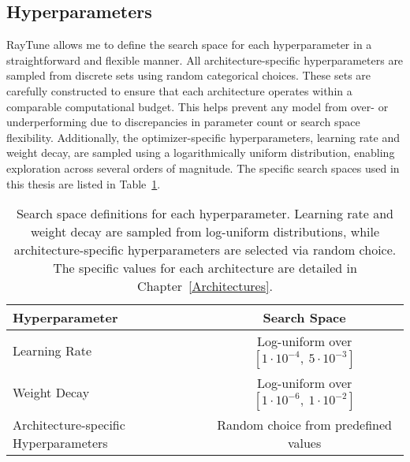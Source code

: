 \subsection{Hyperparameters}

RayTune allows me to define the search space for each hyperparameter in a straightforward and flexible manner. All architecture-specific hyperparameters are sampled from discrete sets using random categorical choices. These sets are carefully constructed to ensure that each architecture operates within a comparable computational budget. This helps prevent any model from over- or underperforming due to discrepancies in parameter count or search space flexibility. Additionally, the optimizer-specific hyperparameters, learning rate and weight decay, are sampled using a logarithmically uniform distribution, enabling exploration across several orders of magnitude. The specific search spaces used in this thesis are listed in Table~\ref{MethodHyperparams}.

\begin{table}[H]
    \centering
    \begin{tabular}{l|c}
        Hyperparameter & Search Space       \\
        \hline
        Learning Rate      & Log-uniform over $[1 \cdot 10^{-4},\ 5 \cdot 10^{-3}]$ \\
        Weight Decay     & Log-uniform over $[1 \cdot 10^{-6},\ 1 \cdot 10^{-2}]$ \\
        Architecture-specific Hyperparameters      & Random choice from predefined values \\
    \end{tabular}
    \caption{Search space definitions for each hyperparameter. Learning rate and weight decay are sampled from log-uniform distributions, while architecture-specific hyperparameters are selected via random choice. The specific values for each architecture are detailed in Chapter~\ref{Architectures}.}
    \label{MethodHyperparams}
\end{table}
